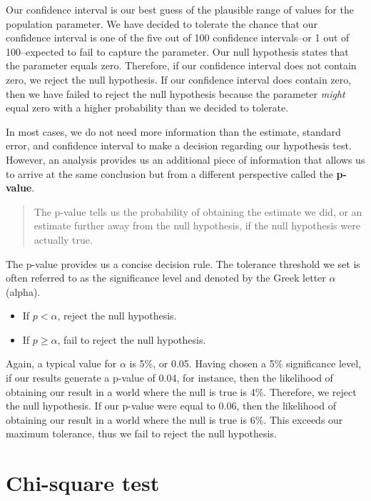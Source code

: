 \documentclass[
]{book}
\providecommand{\tightlist}{%
  \setlength{\itemsep}{0pt}\setlength{\parskip}{0pt}}
\begin{document}
Our confidence interval is our best guess of the plausible range of values for the population parameter. We have decided to tolerate the chance that our confidence interval is one of the five out of 100 confidence intervals--or 1 out of 100--expected to fail to capture the parameter. Our null hypothesis states that the parameter equals zero. Therefore, if our confidence interval does not contain zero, we reject the null hypothesis. If our confidence interval does contain zero, then we have failed to reject the null hypothesis because the parameter \emph{might} equal zero with a higher probability than we decided to tolerate.

In most cases, we do not need more information than the estimate, standard error, and confidence interval to make a decision regarding our hypothesis test. However, an analysis provides us an additional piece of information that allows us to arrive at the same conclusion but from a different perspective called the \textbf{p-value}.

\begin{quote}
The p-value tells us the probability of obtaining the estimate we did, or an estimate further away from the null hypothesis, if the null hypothesis were actually true.
\end{quote}

The p-value provides us a concise decision rule. The tolerance threshold we set is often referred to as the significance level and denoted by the Greek letter \(\alpha\) (alpha).

\begin{itemize}
\tightlist
\item
  If \(p<\alpha\), reject the null hypothesis.
\item
  If \(p\geq \alpha\), fail to reject the null hypothesis.
\end{itemize}

Again, a typical value for \(\alpha\) is 5\%, or 0.05. Having chosen a 5\% significance level, if our results generate a p-value of 0.04, for instance, then the likelihood of obtaining our result in a world where the null is true is 4\%. Therefore, we reject the null hypothesis. If our p-value were equal to 0.06, then the likelihood of obtaining our result in a world where the null is true is 6\%. This exceeds our maximum tolerance, thus we fail to reject the null hypothesis.

\hypertarget{chi-square-test}{%
\section{Chi-square test}\label{chi-square-test}}
\end{document}
